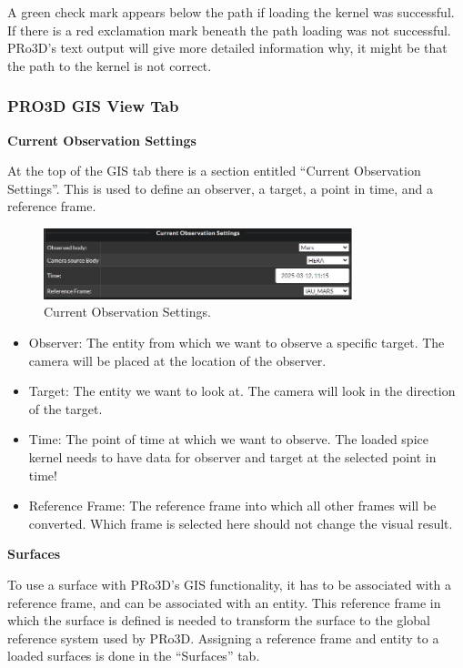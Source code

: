 A green check mark appears below the path if loading the kernel was
successful. If there is a red exclamation mark beneath the path loading
was not successful. PRo3D's text output will give more detailed
information why, it might be that the path to the kernel is not correct.

\hypertarget{pro3d-gis-view-tab}{%
	\subsubsection{PRO3D GIS View Tab}\label{pro3d-gis-view-tab}}

\hypertarget{current-observation-settings}{%
	\textbf{Current Observation
		Settings}\label{current-observation-settings}}

At the top of the GIS tab there is a section entitled ``Current
Observation Settings''. This is used to define an observer, a target, a
point in time, and a reference frame.

\begin{figure}[h!]
	\centering
	\includegraphics[width=0.8\textwidth]{pics/currentObservationSettings.png}
	\caption{Current Observation Settings.}
\end{figure}

\begin{itemize}
	\tightlist
	\item
	Observer: The entity from which we want to observe a specific target.
	The camera will be placed at the location of the observer.
	\item
	Target: The entity we want to look at. The camera will look in the
	direction of the target.
	\item
	Time: The point of time at which we want to observe. The loaded spice
	kernel needs to have data for observer and target at the selected
	point in time!
	\item
	Reference Frame: The reference frame into which all other frames will
	be converted. Which frame is selected here should not change the
	visual result.
\end{itemize}

\hypertarget{surfaces}{%
	\textbf{Surfaces}\label{surfaces}}

To use a surface with PRo3D's GIS functionality, it has to be associated
with a reference frame, and can be associated with an entity. This
reference frame in which the surface is defined is needed to transform
the surface to the global reference system used by PRo3D. Assigning a
reference frame and entity to a loaded surfaces is done in the
``Surfaces'' tab.

